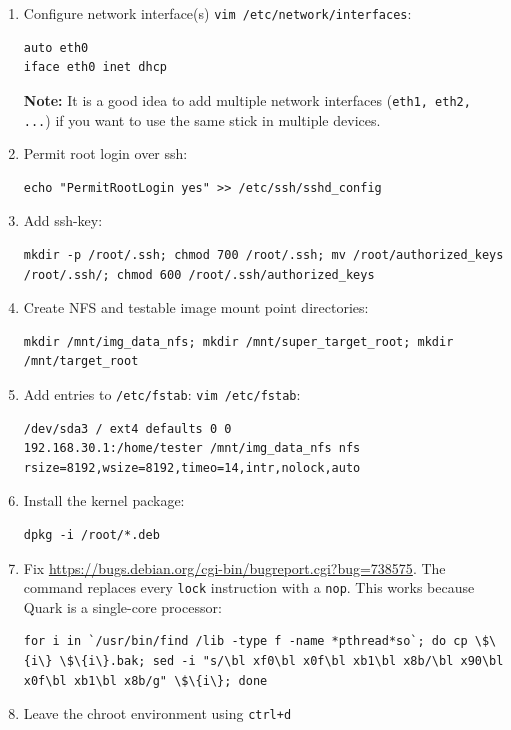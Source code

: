 \documentclass[a4paper,11pt]{article}
\newcommand{\note}{\textbf{Note: }}
\newcommand{\cmd}[1]{\texttt{#1}}
\newcommand{\bl}{\textbackslash}
\begin{document}
\begin{enumerate}
\item Configure network interface(s) \cmd{vim /etc/network/interfaces}:
\begin{lstlisting}
auto eth0
iface eth0 inet dhcp
\end{lstlisting}
\note It is a good idea to add multiple network interfaces (\cmd{eth1, eth2, ...}) if you want to use the same stick in multiple devices.

\item Permit root login over ssh: 
\begin{lstlisting}
echo "PermitRootLogin yes" >> /etc/ssh/sshd_config
\end{lstlisting}

\item Add ssh-key: 
\begin{lstlisting}
mkdir -p /root/.ssh; chmod 700 /root/.ssh; mv /root/authorized_keys /root/.ssh/; chmod 600 /root/.ssh/authorized_keys
\end{lstlisting}

\item Create NFS and testable image mount point directories: 
\begin{lstlisting}
mkdir /mnt/img_data_nfs; mkdir /mnt/super_target_root; mkdir /mnt/target_root
\end{lstlisting}

\item Add entries to \cmd{/etc/fstab}: \cmd{vim /etc/fstab}:
\begin{lstlisting}
/dev/sda3 / ext4 defaults 0 0
192.168.30.1:/home/tester /mnt/img_data_nfs nfs rsize=8192,wsize=8192,timeo=14,intr,nolock,auto
\end{lstlisting}

\item Install the kernel package: 
\begin{lstlisting}
dpkg -i /root/*.deb
\end{lstlisting}

\item Fix \url{https://bugs.debian.org/cgi-bin/bugreport.cgi?bug=738575}. The command replaces every \cmd{lock} instruction with a \cmd{nop}. This works because Quark is a single-core processor: 
\begin{lstlisting}
for i in `/usr/bin/find /lib -type f -name *pthread*so`; do cp \$\{i\} \$\{i\}.bak; sed -i "s/\bl xf0\bl x0f\bl xb1\bl x8b/\bl x90\bl x0f\bl xb1\bl x8b/g" \$\{i\}; done
\end{lstlisting}

\item Leave the chroot environment using \cmd{ctrl+d}


\end{enumerate}
\end{document}
